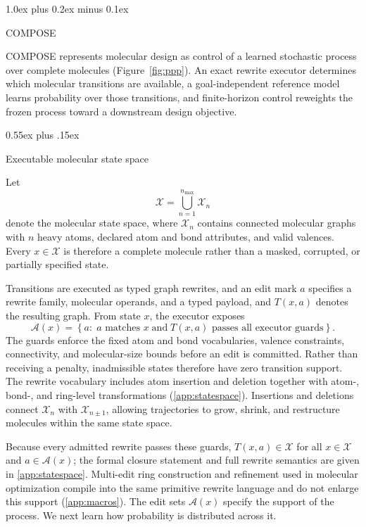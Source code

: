 \documentclass{article}
\makeatletter
\theoremstyle{definition}
\theoremstyle{remark}
\def\section{\@startsection{section}{1}{\z@}{-1.4ex plus -0.4ex minus -.2ex}%
  {1.0ex plus 0.2ex minus 0.1ex}{\large\sc\raggedright}}
\def\subsection{\@startsection{subsection}{2}{\z@}{-1.2ex plus -0.4ex minus -.2ex}%
  {0.55ex plus .15ex}{\normalsize\sc\raggedright}}
\makeatother
\begin{document}
\section{COMPOSE}
\label{sec:method}

COMPOSE represents molecular design as control of a learned stochastic process
over complete molecules (Figure~\ref{fig:ppp}). An exact rewrite executor
determines which molecular transitions are available, a goal-independent
reference model learns probability over those transitions, and finite-horizon
control reweights the frozen process toward a downstream design objective.

\subsection{Executable molecular state space}
\label{sec:gem-support}

Let
\[
  \mathcal X=\bigcup_{n=1}^{n_{\max}}\mathcal X_n
\]
denote the molecular state space, where $\mathcal X_n$ contains connected
molecular graphs with $n$ heavy atoms, declared atom and bond attributes, and
valid valences. Every $x\in\mathcal X$ is therefore a complete molecule rather
than a masked, corrupted, or partially specified state.

Transitions are executed as typed graph rewrites, and an edit mark $a$ specifies a rewrite
family, molecular operands, and a typed payload, and $T(x,a)$ denotes the
resulting graph. From state $x$, the executor exposes
\begin{equation}
  \mathcal A(x)
  =
  \left\{
    a:\; a\text{ matches } x
    \;\text{and}\;
    T(x,a)\text{ passes all executor guards}
  \right\}.
  \label{eq:gem-editset}
\end{equation}
The guards enforce the fixed atom and bond vocabularies, valence
constraints, connectivity, and molecular-size bounds before an edit is
committed. Rather than receiving a penalty, inadmissible states therefore have zero transition support. The rewrite vocabulary includes atom insertion
and deletion together with atom-, bond-, and ring-level transformations
(\cref{app:statespace}). Insertions and deletions connect $\mathcal X_n$ with
$\mathcal X_{n\pm1}$, allowing trajectories to grow, shrink, and restructure
molecules within the same state space.

Because every admitted rewrite passes these guards, $T(x,a)\in\mathcal X$ for
all $x\in\mathcal X$ and $a\in\mathcal A(x)$; the formal closure statement and
full rewrite semantics are given in \cref{app:statespace}. Multi-edit ring construction and
refinement used in molecular optimization compile into the same primitive
rewrite language and do not enlarge this support (\cref{app:macros}). The edit sets $\mathcal A(x)$ specify the support of the process. We next learn
how probability is distributed across it.
\end{document}
